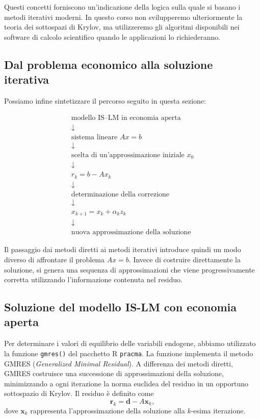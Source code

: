 Questi concetti forniscono un'indicazione della logica sulla quale
si basano i metodi iterativi moderni. In questo corso non
svilupperemo ulteriormente la teoria dei sottospazi di Krylov, ma
utilizzeremo gli algoritmi disponibili nei software di calcolo
scientifico quando le applicazioni lo richiederanno.


\subsection{Dal problema economico alla soluzione iterativa}

Possiamo infine sintetizzare il percorso seguito in questa sezione:

\begin{equation*}
\boxed{
\begin{array}{c}
\text{modello IS--LM in economia aperta}\\
\downarrow\\
\text{sistema lineare }Ax=b\\
\downarrow\\
\text{scelta di un'approssimazione iniziale }x_0\\
\downarrow\\
r_k=b-Ax_k\\
\downarrow\\
\text{determinazione della correzione}\\
\downarrow\\
x_{k+1}=x_k+\alpha_kz_k\\
\downarrow\\
\text{nuova approssimazione della soluzione}
\end{array}}
\end{equation*}

Il passaggio dai metodi diretti ai metodi iterativi introduce
quindi un modo diverso di affrontare il problema $Ax=b$.
Invece di costruire direttamente la soluzione, si genera una
sequenza di approssimazioni che viene progressivamente corretta
utilizzando l'informazione contenuta nel residuo.

\subsection{Soluzione del modello IS-LM con economia aperta}

Per determinare i valori di equilibrio delle variabili
endogene, abbiamo utilizzato la funzione
\texttt{gmres()} del pacchetto R \texttt{pracma}.
La funzione implementa il metodo GMRES
(\emph{Generalized Minimal Residual}).
A differenza dei metodi diretti, GMRES costruisce
una successione di approssimazioni della soluzione,
minimizzando a ogni iterazione la norma euclidea
del residuo in un opportuno sottospazio di Krylov.
Il residuo è definito come
\[
\mathbf{r}_k=\mathbf{d}-A\mathbf{x}_k,
\]
dove $\mathbf{x}_k$ rappresenta l'approssimazione
della soluzione alla $k$-esima iterazione.

